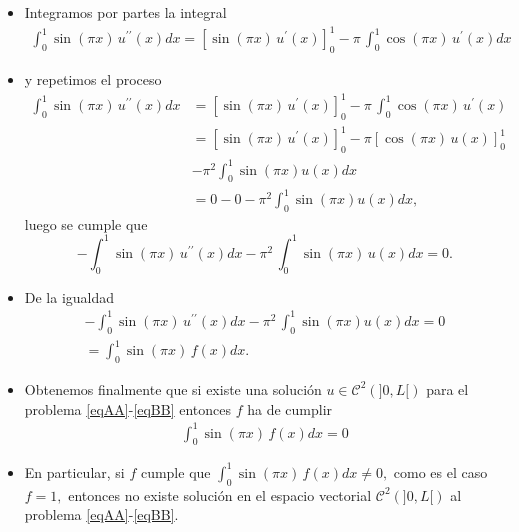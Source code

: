 \documentclass[10pt,handout]{beamer}
\theoremstyle{plain} %
\theoremstyle{plain} %
\theoremstyle{plain} %
\theoremstyle{plain} %
\theoremstyle{definition}
\theoremstyle{example}
\theoremstyle{example}
\theoremstyle{remark}
\theoremstyle{remark}
\begin{document}
\begin{frame}
\begin{itemize}
\item Integramos por partes la integral
\begin{align*}
\int_0^1 \sin(\pi x) \, u^{\prime \prime}(x) dx = [\sin(\pi x) \, u^{\prime}(x)]_0^1 -
\pi\, \int_0^1 \cos(\pi x) \, u^{\prime}(x) dx
\end{align*}
\item y repetimos el proceso
\begin{align*}
\int_0^1 \sin(\pi x) \, u^{\prime \prime}(x) dx & = [\sin(\pi x) \, u^{\prime}(x)]_0^1 -
\pi\, \int_0^1 \cos(\pi x) \, u^{\prime}(x) \\ 
& = [\sin(\pi x) \, u^{\prime}(x)]_0^1 - \pi [ \cos(\pi x) \, u(x)]_0^1  \\ 
& - \pi^2 \int_0^1 \sin(\pi x) u(x) dx \\ 
& = 0 - 0 - \pi^2 \int_0^1 \sin(\pi x) u(x) dx,
\end{align*}
luego se cumple que
$$
- \int_0^1 \sin(\pi x) \, u^{\prime \prime}(x) dx -  \pi^2 \, \int_0^1 \sin(\pi x) \, u(x)  dx = 0. 
$$
\end{itemize}
\end{frame}


\begin{frame}
\begin{itemize}
\item De la igualdad
\begin{align*}
- \int_0^1 \sin(\pi x) \, u^{\prime \prime}(x) dx  - \pi^2 \, \int_0^1 \sin(\pi x) u(x) dx = 0  \\ = \int_0^1 \sin(\pi x)\, f(x) dx.
\end{align*}
\item Obtenemos finalmente que si existe una solución $u \in \mathcal{C}^2(]0,L[)$ para el problema  \eqref{eqAA}-\eqref{eqBB} entonces $f$ ha de cumplir
\begin{align}
\int_0^1 \sin(\pi x)\, f(x) dx = 0 \label{condA}
\end{align}
\item En particular, si $f$ cumple que $\int_0^1 \sin(\pi x)\, f(x) dx \neq 0,$ como es el caso
$f=1,$ entonces no existe solución en el espacio vectorial $\mathcal{C}^2(]0,L[)$ al problema \eqref{eqAA}-\eqref{eqBB}.
\end{itemize}
\end{frame}
\end{document}
